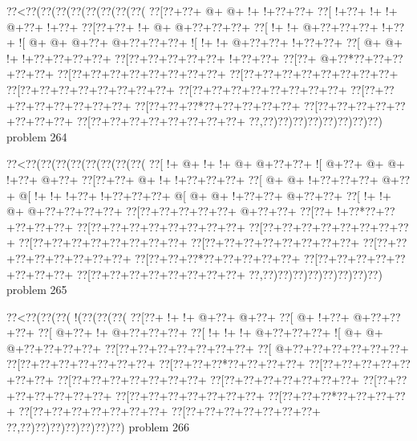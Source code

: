 \vbox{\vbox{\goo
\0??<\0??(\0??(\0??(\0??(\0??(\0??(\0??(\0??(
\0??[\0??+\0??+\- @+\- @+\- !+\- !+\0??+\0??+
\0??[\- !+\0??+\- !+\- !+\- @+\0??+\- !+\0??+
\0??[\0??+\0??+\- !+\- @+\- @+\0??+\0??+\0??+
\0??[\- !+\- !+\- @+\0??+\0??+\0??+\- !+\0??+
\- ![\- @+\- @+\- @+\0??+\- @+\0??+\0??+\0??+
\- ![\- !+\- !+\- @+\0??+\0??+\- !+\0??+\0??+
\0??[\- @+\- @+\- !+\- !+\0??+\0??+\0??+\0??+
\0??[\0??+\0??+\0??+\0??+\0??+\- !+\0??+\0??+
\0??[\0??+\- @+\0??*\0??+\0??+\0??+\0??+\0??+
\0??[\0??+\0??+\0??+\0??+\0??+\0??+\0??+\0??+
\0??[\0??+\0??+\0??+\0??+\0??+\0??+\0??+\0??+
\0??[\0??+\0??+\0??+\0??+\0??+\0??+\0??+\0??+
\0??[\0??+\0??+\0??+\0??+\0??+\0??+\0??+\0??+
\0??[\0??+\0??+\0??+\0??+\0??+\0??+\0??+\0??+
\0??[\0??+\0??+\0??*\0??+\0??+\0??+\0??+\0??+
\0??[\0??+\0??+\0??+\0??+\0??+\0??+\0??+\0??+
\0??[\0??+\0??+\0??+\0??+\0??+\0??+\0??+\0??+
\0??,\0??)\0??)\0??)\0??)\0??)\0??)\0??)\0??)
}
\hfil problem 264\hfil\break
}

\vbox{\vbox{\goo
\0??<\0??(\0??(\0??(\0??(\0??(\0??(\0??(\0??(
\0??[\- !+\- @+\- !+\- !+\- @+\- @+\0??+\0??+
\- ![\- @+\0??+\- @+\- @+\- !+\0??+\- @+\0??+
\0??[\0??+\0??+\- @+\- !+\- !+\0??+\0??+\0??+
\0??[\- @+\- @+\- !+\0??+\0??+\0??+\- @+\0??+
\- @[\- !+\- !+\- !+\0??+\- !+\0??+\0??+\0??+
\- @[\- @+\- @+\- !+\0??+\0??+\- @+\0??+\0??+
\0??[\- !+\- !+\- @+\- @+\0??+\0??+\0??+\0??+
\0??[\0??+\0??+\0??+\0??+\0??+\- @+\0??+\0??+
\0??[\0??+\- !+\0??*\0??+\0??+\0??+\0??+\0??+
\0??[\0??+\0??+\0??+\0??+\0??+\0??+\0??+\0??+
\0??[\0??+\0??+\0??+\0??+\0??+\0??+\0??+\0??+
\0??[\0??+\0??+\0??+\0??+\0??+\0??+\0??+\0??+
\0??[\0??+\0??+\0??+\0??+\0??+\0??+\0??+\0??+
\0??[\0??+\0??+\0??+\0??+\0??+\0??+\0??+\0??+
\0??[\0??+\0??+\0??*\0??+\0??+\0??+\0??+\0??+
\0??[\0??+\0??+\0??+\0??+\0??+\0??+\0??+\0??+
\0??[\0??+\0??+\0??+\0??+\0??+\0??+\0??+\0??+
\0??,\0??)\0??)\0??)\0??)\0??)\0??)\0??)\0??)
}
\hfil problem 265\hfil\break
}

\vbox{\vbox{\goo
\0??<\0??(\0??(\0??(\- !(\0??(\0??(\0??(
\0??[\0??+\- !+\- !+\- @+\0??+\- @+\0??+
\0??[\- @+\- !+\0??+\- @+\0??+\0??+\0??+
\0??[\- @+\0??+\- !+\- @+\0??+\0??+\0??+
\0??[\- !+\- !+\- !+\- @+\0??+\0??+\0??+
\- ![\- @+\- @+\- @+\0??+\0??+\0??+\0??+
\0??[\0??+\0??+\0??+\0??+\0??+\0??+\0??+
\0??[\- @+\0??+\0??+\0??+\0??+\0??+\0??+
\0??[\0??+\0??+\0??+\0??+\0??+\0??+\0??+
\0??[\0??+\0??+\0??*\0??+\0??+\0??+\0??+
\0??[\0??+\0??+\0??+\0??+\0??+\0??+\0??+
\0??[\0??+\0??+\0??+\0??+\0??+\0??+\0??+
\0??[\0??+\0??+\0??+\0??+\0??+\0??+\0??+
\0??[\0??+\0??+\0??+\0??+\0??+\0??+\0??+
\0??[\0??+\0??+\0??+\0??+\0??+\0??+\0??+
\0??[\0??+\0??+\0??*\0??+\0??+\0??+\0??+
\0??[\0??+\0??+\0??+\0??+\0??+\0??+\0??+
\0??[\0??+\0??+\0??+\0??+\0??+\0??+\0??+
\0??,\0??)\0??)\0??)\0??)\0??)\0??)\0??)
}
\hfil problem 266\hfil\break
}

